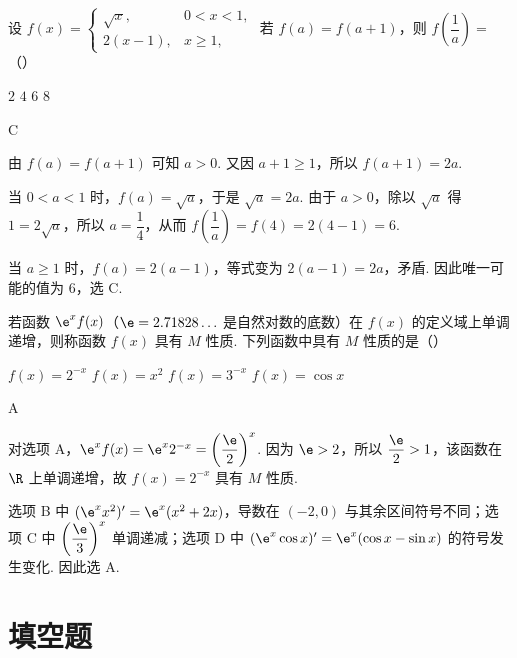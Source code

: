 \begin{problem}
设
\(f(x)=\begin{cases}
\sqrt{x},&0<x<1,\\
2(x-1),&x\ge1,
\end{cases}\)
若 \(f(a)=f(a+1)\)，则 \(f\!\left(\dfrac1a\right)=\)（\quad）

\choices
    {\(2\)}
    {\(4\)}
    {\(6\)}
    {\(8\)}
\end{problem}

\begin{answer}
C
\end{answer}

\begin{solution}
由 \(f(a)=f(a+1)\) 可知 \(a>0\). 又因 \(a+1\geq1\)，所以 \(f(a+1)=2a\).

当 \(0<a<1\) 时，\(f(a)=\sqrt a\)，于是 \(\sqrt a=2a\). 由于 \(a>0\)，除以 \(\sqrt a\) 得 \(1=2\sqrt a\)，所以 \(a=\dfrac14\)，从而
\(f\left(\dfrac1a\right)=f(4)=2(4-1)=6\).

当 \(a\geq1\) 时，\(f(a)=2(a-1)\)，等式变为 \(2(a-1)=2a\)，矛盾. 因此唯一可能的值为 \(6\)，选 C.
\end{solution}

\begin{problem}
若函数 \(\e^x f(x)\)（\(\e=2.71828\ldots\) 是自然对数的底数）在 \(f(x)\) 的定义域上单调递增，则称函数 \(f(x)\) 具有 \(M\) 性质. 下列函数中具有 \(M\) 性质的是（\quad）

\choices
    {\(f(x)=2^{-x}\)}
    {\(f(x)=x^2\)}
    {\(f(x)=3^{-x}\)}
    {\(f(x)=\cos x\)}
\end{problem}

\begin{answer}
A
\end{answer}

\begin{solution}
对选项 A，\(\e^xf(x)=\e^x2^{-x}=\left(\dfrac{\e}{2}\right)^x\). 因为 \(\e>2\)，所以 \(\dfrac{\e}{2}>1\)，该函数在 \(\R\) 上单调递增，故 \(f(x)=2^{-x}\) 具有 \(M\) 性质.

选项 B 中 \((\e^xx^2)'=\e^x(x^2+2x)\)，导数在 \((-2,0)\) 与其余区间符号不同；选项 C 中 \(\left(\dfrac{\e}{3}\right)^x\) 单调递减；选项 D 中 \((\e^x\cos x)'=\e^x(\cos x-\sin x)\) 的符号发生变化. 因此选 A.
\end{solution}

\section{填空题}

